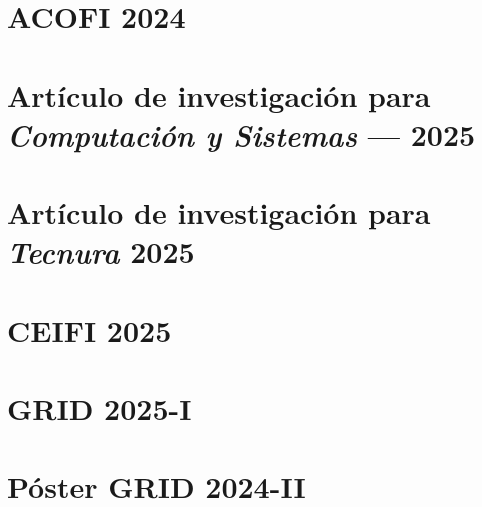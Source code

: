 \appendix


\newpage




\newpage



\newpage



\newpage


\FloatBarrier\section{ACOFI 2024}

\newpage

\FloatBarrier\section{Artículo de investigación para \textbf{\textit{Computación y Sistemas}} --- 2025}

\newpage


\FloatBarrier\section{Artículo de investigación para \textbf{\textit{Tecnura}} 2025}

\newpage


\FloatBarrier\section{CEIFI 2025}

\newpage

\FloatBarrier\section{GRID 2025-I }

\newpage


\FloatBarrier\section{Póster GRID 2024-II}

\newpage
